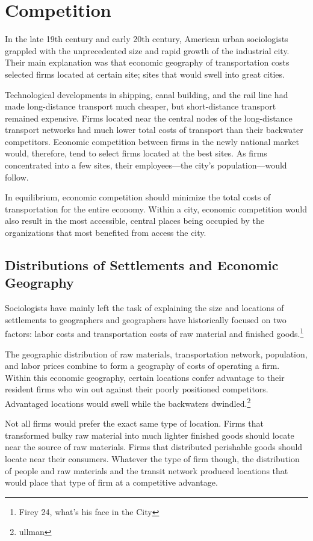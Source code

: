 \section*{Competition} 
In the late 19th century and early 20th century, American urban
sociologists grappled with the unprecedented size and rapid growth of
the industrial city. Their main explanation was that economic
geography of transportation costs selected firms located at certain site;
sites that would swell into great cities.

Technological developments in shipping, canal building, and the rail
line had made long-distance transport much cheaper, but short-distance
transport remained expensive. Firms located near the central nodes of
the long-distance transport networks had much lower total costs of
transport than their backwater competitors. Economic competition
between firms in the newly national market would, therefore, tend to
select firms located at the best sites. As firms concentrated into a
few sites, their employees---the city's population---would follow.

In equilibrium, economic competition should minimize the total costs
of transportation for the entire economy.  Within a city, economic
competition would also result in the most accessible, central places
being occupied by the organizations that most benefited from
access the city.

\subsection*{Distributions of Settlements and Economic Geography}
Sociologists have mainly left the task of explaining the size and
locations of settlements to geographers and geographers have
historically focused on two factors: labor costs and transportation
costs of raw material and finished goods.\footnote{Firey 24, what's
  his face in the City}

The geographic distribution of raw materials, transportation network,
population, and labor prices combine to form a geography of costs of
operating a firm. Within this economic geography, certain locations
confer advantage to their resident firms who win out against their
poorly positioned competitors. Advantaged locations would swell while
the backwaters dwindled.\footnote{ullman}

Not all firms would prefer the exact same type of location. Firms that
transformed bulky raw material into much lighter finished goods should
locate near the source of raw materials. Firms that distributed
perishable goods should locate near their consumers. Whatever the type
of firm though, the distribution of people and raw materials and the
transit network produced locations that would place that type of firm
at a competitive advantage.

